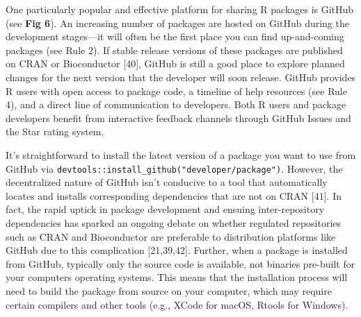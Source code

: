 \documentclass[10pt,letterpaper]{article}
\begin{document}
One particularly popular and effective platform for sharing R packages
is GitHub (see \textbf{Fig 6}). An increasing number of packages are
hosted on GitHub during the development stages---it will often be the
first place you can find up-and-coming packages (see Rule 2). If stable
release versions of these packages are published on CRAN or Bioconductor
{[}40{]}, GitHub is still a good place to explore planned changes for
the next version that the developer will soon release. GitHub provides R
users with open access to package code, a timeline of help resources
(see Rule 4), and a direct line of communication to developers. Both R
users and package developers benefit from interactive feedback channels
through GitHub Issues and the Star rating system.

It's straightforward to install the latest version of a package you want
to use from GitHub via
\texttt{devtools::install\_github("developer/package")}. However, the
decentralized nature of GitHub isn't conducive to a tool that
automatically locates and installs corresponding dependencies that are
not on CRAN {[}41{]}. In fact, the rapid uptick in package development
and ensuing inter-repository dependencies has sparked an ongoing debate
on whether regulated repositories such as CRAN and Bioconductor are
preferable to distribution platforms like GitHub due to this
complication {[}21,39,42{]}. Further, when a package is installed from
GitHub, typically only the source code is available, not binaries
pre-built for your computers operating systems. This means that the
installation process will need to build the package from source on your
computer, which may require certain compilers and other tools (e.g.,
XCode for macOS, Rtools for Windows).
\end{document}
